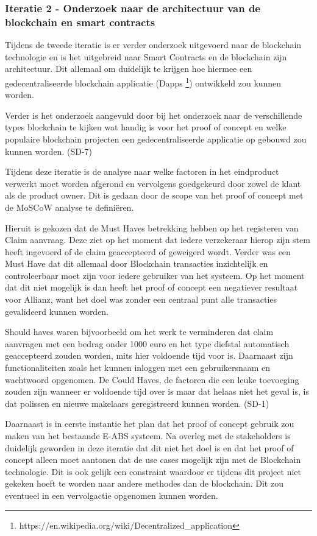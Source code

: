 \subsubsection{Iteratie 2 - Onderzoek naar de architectuur van de blockchain en smart contracts}
Tijdens de tweede iteratie is er verder onderzoek uitgevoerd naar de blockchain technologie en is het uitgebreid naar Smart Contracts en de blockchain zijn architectuur. Dit allemaal om duidelijk te krijgen hoe hiermee een gedecentraliseerde blockchain applicatie (Dapps \footnote{https://en.wikipedia.org/wiki/Decentralized\_application}) ontwikkeld zou kunnen worden.\par

Verder is het onderzoek aangevuld door bij het onderzoek naar de verschillende types blockchain te kijken wat handig is voor het proof of concept en welke populaire blockchain projecten een gedecentraliseerde applicatie op gebouwd zou kunnen worden. (SD-7)\par

Tijdens deze iteratie is de analyse naar welke factoren in het eindproduct verwerkt moet worden afgerond en vervolgens goedgekeurd door zowel de klant als de product owner. Dit is gedaan door de scope van het proof of concept met de MoSCoW analyse te definiëren.\par

Hieruit is gekozen dat de Must Haves betrekking hebben op het registeren van Claim aanvraag. Deze ziet op het moment dat iedere verzekeraar hierop zijn stem heeft ingevoerd of de claim geaccepteerd of geweigerd wordt. Verder was een Must Have dat dit allemaal door Blockchain transacties inzichtelijk en controleerbaar moet zijn voor iedere gebruiker van het systeem. Op het moment dat dit niet mogelijk is dan heeft het proof of concept een negatiever resultaat voor Allianz, want het doel was zonder een centraal punt alle transacties gevalideerd kunnen worden.\par

Should haves waren bijvoorbeeld om het werk te verminderen dat claim aanvragen met een bedrag onder 1000 euro en het type diefstal automatisch geaccepteerd zouden worden, mits hier voldoende tijd voor is. Daarnaast zijn functionaliteiten zoals het kunnen inloggen met een gebruikersnaam en wachtwoord opgenomen. De Could Haves, de factoren die een leuke toevoeging zouden zijn wanneer er voldoende tijd over is maar dat helaas niet het geval is, is dat polissen en nieuwe makelaars geregistreerd kunnen worden. (SD-1)\par

Daarnaast is in eerste instantie het plan dat het proof of concept gebruik zou maken van het bestaande E-ABS systeem. Na overleg met de stakeholders is duidelijk geworden in deze iteratie dat dit niet het doel is en dat het proof of concept alleen moet aantonen dat de use cases mogelijk zijn met de Blockchain technologie. Dit is ook gelijk een constraint waardoor er tijdens dit project niet gekeken hoeft te worden naar andere methodes dan de blockchain. Dit zou eventueel in een vervolgactie opgenomen kunnen worden.